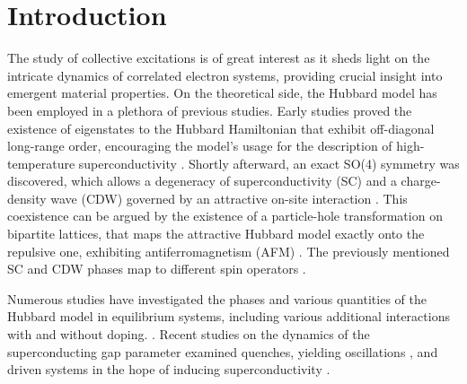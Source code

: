 \documentclass[
    reprint, 
    aps,
    preprintnumbers,
    twocolumn,
    prb,
    superscriptaddress
]{revtex4-2}
\begin{document}

\section{Introduction}\label{sec:introduction}


The study of collective excitations is of great interest as it sheds light on the intricate dynamics of correlated electron systems, providing crucial insight into emergent material properties.
On the theoretical side, the Hubbard model has been employed in a plethora of previous studies. 
Early studies proved the existence of eigenstates to the Hubbard Hamiltonian that exhibit off-diagonal long-range order,
encouraging the model's usage for the description of high-temperature superconductivity \cite{yang89}.
Shortly afterward, an exact SO(4) symmetry was discovered, which allows a degeneracy of superconductivity (SC) and a charge-density wave (CDW) governed by an attractive on-site interaction \cite{yang90}.
This coexistence can be argued by the existence of a particle-hole transformation on bipartite lattices, 
that maps the attractive Hubbard model exactly onto the repulsive one, exhibiting antiferromagnetism (AFM) \cite{Hirsch85}.
The previously mentioned SC and CDW phases map to different spin operators \cite{zitko15,lieb89}.

Numerous studies have investigated the phases and various quantities of the Hubbard model in equilibrium systems, including various additional interactions with and without doping.
\cite{Micnas88,Micnas88b,Micnas89,Dzierzawa92,Kostyrko92,Eriksson95,Staudt00,Onari04,Toschi05,Brackett16,Paki19,romer20,Sushchyev22}.
Recent studies on the dynamics of the superconducting gap parameter examined quenches, yielding oscillations \cite{Volkov73,Yuzbashyan05,Yuzbashyan06,Barankov06,Cui19}, 
and driven systems in the hope of inducing superconductivity \cite{Nicoletti14,Krull14,Moor14,Casandruc15,patel16,sentef17,Buenemann17}.
\end{document}
